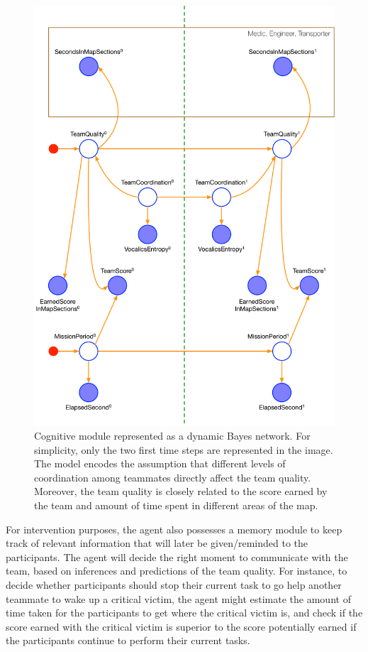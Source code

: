 \begin{figure}[htb]
\centering
\includegraphics[width=\textwidth]{images/pgm}	
\caption{Cognitive module represented as a dynamic Bayes network. For simplicity, only the two first time steps are represented in the image. The model encodes the assumption that different levels of coordination among teammates directly affect the team quality. Moreover, the team quality is closely related to the score earned by the team and amount of time spent in different areas of the map.}
\label{fig:pgm}
\end{figure}

For intervention purposes, the agent also possesses a memory module to keep track of relevant information that will later be given/reminded to the participants. The agent will decide the right moment to communicate with the team, based on inferences and predictions of the team quality. For instance, to decide whether participants should stop their current task to go help another teammate to wake up a critical victim, the agent might estimate the amount of time taken for the participants to get where the critical victim is, and check if the score earned with the critical victim is superior to the score potentially earned if the participants continue to perform their current tasks. 

